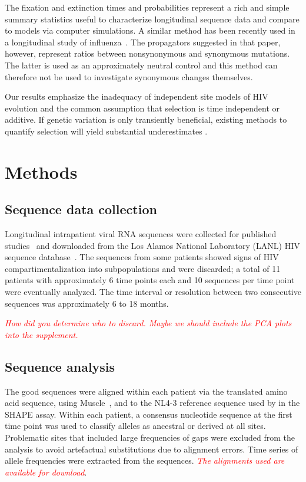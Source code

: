 \documentclass[rmp, twocolumn]{revtex4}
\newcommand{\comment}[1]{\textit{\textcolor{red}{#1}}}
\begin{document}
The fixation and extinction times and probabilities represent a rich and simple
summary statistics useful to characterize longitudinal sequence data and compare
to models via computer simulations.
A similar method has been recently used in a longitudinal study of
influenza~\citep{strelkowa_clonal_2012}. The propagators suggested in that
paper, however, represent ratios between nonsynonymous and synonymous mutations.
The latter is used as an approximately neutral control and this method can
therefore not be used to investigate synonymous changes themselves.

Our results emphasize the inadequacy of independent site
models of HIV evolution and the common assumption that selection is time
independent or additive. If genetic variation is only transiently beneficial,
existing methods to quantify selection will yield substantial underestimates
\citep{williamson_adaptation_2003,neher_rate_2010,batorsky_estimate_2011}.

\section{Methods}
\subsection{Sequence data collection}

Longitudinal intrapatient viral RNA sequences were collected for published
studies~\citep{shankarappa_consistent_1999, liu_selection_2006,
bunnik_autologous_2008} and downloaded from the Los Alamos National Laboratory
(LANL) HIV sequence database~\citep{LANL2012}. The sequences from some patients
showed signs of HIV compartimentalization into subpopulations and were
discarded; a total of 11 patients with approximately 6 time points each and 10
sequences per time point were eventually analyzed. The time interval or
resolution between two consecutive sequences was approximately 6 to 18 months.

\comment{How did you determine who to discard. Maybe we should include the PCA
plots into the supplement.}


\subsection{Sequence analysis}
The good sequences were aligned within each patient
via the translated amino acid sequence, using
Muscle~\citep{edgar_muscle:_2004}, and to the NL4-3 reference sequence used
by \citet{watts_architecture_2009} in the SHAPE assay. Within each patient, a
consensus nucleotide sequence at the first time point was used to classify
alleles as ancestral or derived at all sites. Problematic sites that included large frequencies of gaps
were excluded from the analysis to avoid artefactual substitutions due to
alignment errors. Time series of allele frequencies were extracted from the
sequences. \comment{The alignments used are available for download}. 
\end{document}
